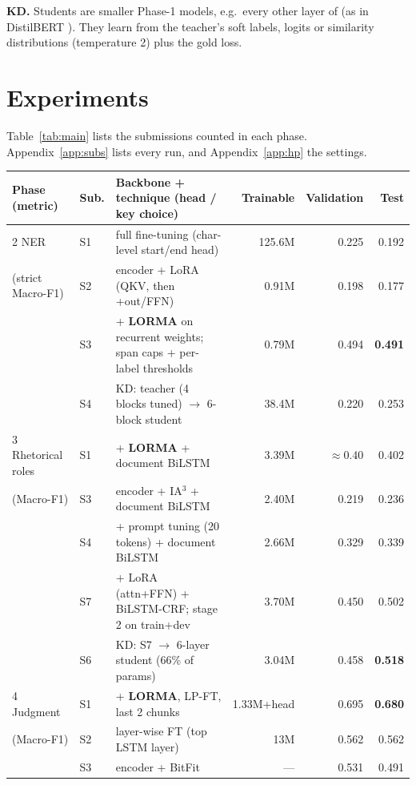 \textbf{KD.} Students are smaller Phase-1 models, e.g.\ every other layer of \A{} (as in DistilBERT \cite{distilbert}). They learn from the teacher's soft labels, logits or similarity distributions (temperature 2) plus the gold loss.

\section{Experiments}\label{sec:exp}
Table~\ref{tab:main} lists the submissions counted in each phase. Appendix~\ref{app:subs} lists every run, and Appendix~\ref{app:hp} the settings.

\begin{table}[t]\centering\footnotesize\setlength{\tabcolsep}{4pt}
\begin{tabularx}{\textwidth}{@{}l l X r r r@{}}\toprule
Phase (metric) & Sub. & Backbone + technique (head / key choice) & Trainable & Validation & \textbf{Test} \\\midrule
2 NER & S1 & \A{} full fine-tuning (char-level start/end head) & 125.6M & 0.225 & 0.192 \\
(strict Macro-F1) & S2 & \B{} encoder + LoRA (QKV, then +out/FFN) & 0.91M & 0.198 & 0.177 \\
 & S3 & \C{} + \textbf{LORMA} on recurrent weights; span caps + per-label thresholds & 0.79M & 0.494 & \textbf{0.491} \\
 & S4 & KD: \D{} teacher (4 blocks tuned) $\rightarrow$ 6-block \D{} student & 38.4M & 0.220 & 0.253 \\\midrule
3 Rhetorical roles & S1 & \C{} + \textbf{LORMA} + document BiLSTM & 3.39M & $\approx$0.40 & 0.402 \\
(Macro-F1) & S3 & \B{} encoder + IA$^3$ + document BiLSTM & 2.40M & 0.219 & 0.236 \\
 & S4 & \D{} + prompt tuning (20 tokens) + document BiLSTM & 2.66M & 0.329 & 0.339 \\
 & S7 & \A{} + LoRA (attn+FFN) + BiLSTM-CRF; stage 2 on train+dev & 3.70M & 0.450 & 0.502 \\
 & S6 & KD: S7 $\rightarrow$ 6-layer \A{} student (66\% of params) & 3.04M & 0.458 & \textbf{0.518} \\\midrule
4 Judgment & S1 & \A{} + \textbf{LORMA}, LP-FT, last 2 chunks & 1.33M+head & 0.695 & \textbf{0.680} \\
(Macro-F1) & S2 & \C{} layer-wise FT (top LSTM layer) & 13M & 0.562 & 0.562 \\
 & S3 & \B{} encoder + BitFit & --- & 0.531 & 0.491 \\

\end{tabularx}
\end{table}
